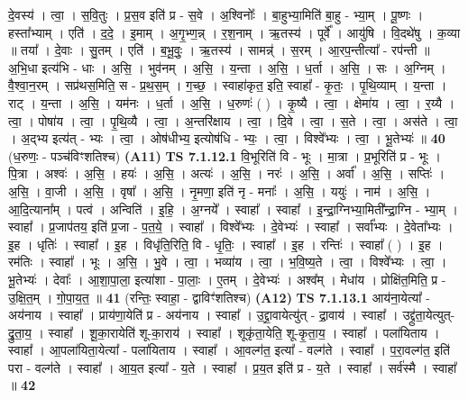 \documentclass[17pt]{extarticle}
\begin{document}
                  दे॒वस्य॑ । त्वा॒ । स॒वि॒तुः । प्र॒स॒व इति॑ प्र - स॒वे । अ॒श्विनोः᳚ । बा॒हुभ्या॒मिति॑ बा॒हु - भ्या॒म् । पू॒ष्णः । हस्ता᳚भ्याम् । एति॑ । द॒दे॒ । इ॒माम् । अ॒गृ॒भ्ण॒न्न् । र॒श॒नाम् । ऋ॒तस्य॑ । पूर्वे᳚ । आयु॑षि । वि॒दथे॑षु । क॒व्या ॥ तया᳚ । दे॒वाः । सु॒तम् । एति॑ । ब॒भू॒वुः॒ । ऋ॒तस्य॑ । सामन्न्॑ । स॒रम् । आ॒रप॒न्तीत्या᳚ - रप॑न्ती ॥ अ॒भि॒धा इत्य॑भि - धाः । अ॒सि॒ । भुव॑नम् । अ॒सि॒ । य॒न्ता । अ॒सि॒ । ध॒र्ता । अ॒सि॒ । सः । अ॒ग्निम् । वै॒श्वा॒न॒रम् । सप्र॑थस॒मिति॒ स - प्र॒थ॒स॒म् । ग॒च्छ॒ । स्वाहा॑कृत॒ इति॒ स्वाहा᳚ - कृ॒तः॒ । पृ॒थि॒व्याम् । य॒न्ता । राट् । य॒न्ता । अ॒सि॒ । यम॑नः । ध॒र्ता । अ॒सि॒ । ध॒रुणः॑ ( ) । कृ॒ष्यै । त्वा॒ । क्षेमा॑य । त्वा॒ । र॒य्यै । त्वा॒ । पोषा॑य । त्वा॒ । पृ॒थि॒व्यै । त्वा॒ । अ॒न्तरि॑क्षाय । त्वा॒ । दि॒वे । त्वा॒ । स॒ते । त्वा॒ । अस॑ते । त्वा॒ । अ॒द्भ्य इत्य॑त् - भ्यः । त्वा॒ । ओष॑धीभ्य॒ इत्योष॑धि - भ्यः॒ । त्वा॒ । विश्वे᳚भ्यः । त्वा॒ । भू॒तेभ्यः॑ ॥ \textbf{  40 } \newline
                  \newline
                      (ध॒रुणः॒ - पञ्च॑विꣳशतिश्च)  \textbf{(A11)} \newline \newline
                                \textbf{ TS 7.1.12.1} \newline
                  वि॒भूरिति॑ वि - भूः । मा॒त्रा । प्र॒भूरिति॑ प्र - भूः । पि॒त्रा । अश्वः॑ । अ॒सि॒ । हयः॑ । अ॒सि॒ । अत्यः॑ । अ॒सि॒ । नरः॑ । अ॒सि॒ । अर्वा᳚ । अ॒सि॒ । सप्तिः॑ । अ॒सि॒ । वा॒जी । अ॒सि॒ । वृषा᳚ । अ॒सि॒ । नृ॒मणा॒ इति॑ नृ - मनाः᳚ । अ॒सि॒ । ययुः॑ । नाम॑ । अ॒सि॒ । आ॒दि॒त्याना᳚म् । पत्व॑ । अन्विति॑ । इ॒हि॒ । अ॒ग्नये᳚ । स्वाहा᳚ । स्वाहा᳚ । इ॒न्द्रा॒ग्निभ्या॒मिती᳚न्द्रा॒ग्नि - भ्या॒म् । स्वाहा᳚ । प्र॒जाप॑तय॒ इति॑ प्र॒जा - प॒त॒ये॒ । स्वाहा᳚ । विश्वे᳚भ्यः । दे॒वेभ्यः॑ । स्वाहा᳚ । सर्वा᳚भ्यः । दे॒वेता᳚भ्यः । इ॒ह । धृतिः॑ । स्वाहा᳚ । इ॒ह । विधृ॑ति॒रिति॒ वि - धृ॒तिः॒ । स्वाहा᳚ । इ॒ह । रन्तिः॑ । स्वाहा᳚ ( ) । इ॒ह । रम॑तिः । स्वाहा᳚ । भूः । अ॒सि॒ । भु॒वे । त्वा॒ । भव्या॑य । त्वा॒ । भ॒वि॒ष्य॒ते । त्वा॒ । विश्वे᳚भ्यः । त्वा॒ । भू॒तेभ्यः॑ । देवाः᳚ । आ॒शा॒पा॒ला॒ इत्या॑शा - पा॒लाः॒ । ए॒तम् । दे॒वेभ्यः॑ । अश्व᳚म् । मेधा॑य । प्रोक्षि॑त॒मिति॒ प्र - उ॒क्षि॒त॒म् । गो॒पा॒य॒त॒ ॥ \textbf{  41} \newline
                  \newline
                      (रन्तिः॒ स्वाहा॒ - द्वाविꣳ॑शतिश्च)  \textbf{(A12)} \newline \newline
                                \textbf{ TS 7.1.13.1} \newline
                  आय॑ना॒येत्या᳚ - अय॑नाय । स्वाहा᳚ । प्राय॑णा॒येति॑ प्र - अय॑नाय । स्वाहा᳚ । उ॒द्द्रा॒वायेत्यु॑त् - द्रा॒वाय॑ । स्वाहा᳚ । उद्द्रु॑ता॒येत्युत्-द्रु॒ता॒य॒ । स्वाहा᳚ । शू॒का॒रायेति॑ शू-का॒राय॑ । स्वाहा᳚ । शूकृ॑ता॒येति॒ शू-कृ॒ता॒य॒ । स्वाहा᳚ । पला॑यिताय । स्वाहा᳚ । आ॒पला॑यिता॒येत्या᳚ - पला॑यिताय । स्वाहा᳚ । आ॒वल्ग॑त॒ इत्या᳚ - वल्ग॑ते । स्वाहा᳚ । प॒रा॒वल्ग॑त॒ इति॑ परा - वल्ग॑ते । स्वाहा᳚ । आ॒य॒त इत्या᳚ - य॒ते । स्वाहा᳚ । प्र॒य॒त इति॑ प्र - य॒ते । स्वाहा᳚ । सर्व॑स्मै । स्वाहा᳚ ॥ \textbf{  42} \newline
\end{document}
